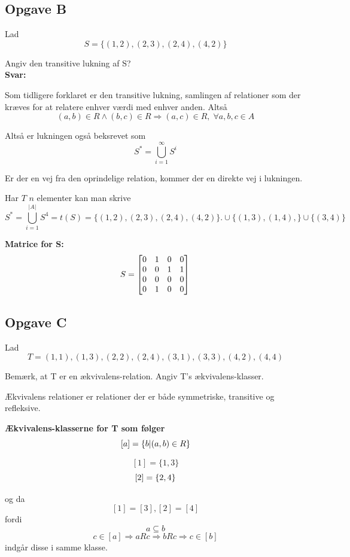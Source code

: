 \documentclass{article}
\begin{document}
\subsection{Opgave B}
Lad \[S = \{(1, 2),(2, 3),(2, 4),(4, 2)\}\]


Angiv den transitive lukning af S?
\\\textbf{Svar:}


Som tidligere forklaret er den transitive lukning, samlingen af relationer som der kræves for at relatere enhver værdi med enhver anden. Altså \[(a,b)\in R \wedge (b,c)\in R \Rightarrow (a,c)\in R, \;  \forall a,b,c \in A\]

Altså er lukningen også beksrevet som \[S^*=\bigcup_{i=1}^{\infty} S^i\]

Er der en vej fra den oprindelige relation, kommer der en direkte vej i lukningen.

Har $T$ $n$ elementer kan man skrive \[S^*=\bigcup_{i=1}^{|A|} S^4 = t(S)= \{(1, 2),(2, 3),(2, 4),(4, 2)\}. \cup \{(1,3), (1,4),\} \cup \{(3,4)\}\]



\textbf{Matrice for S:}\\

\[S=\begin{bmatrix}
0 & 1 & 0 & 0\\
0 & 0 & 1 & 1\\
0 & 0 & 0 & 0\\
0 & 1 & 0 & 0
\end{bmatrix}\\\]



\subsection{Opgave C}

Lad \[T = {(1, 1),(1, 3),(2, 2),(2, 4),(3, 1),(3, 3),(4, 2),(4, 4)}\]

Bemærk, at T er en ækvivalens-relation.
Angiv T's ækvivalens-klasser.

Ækvivalens relationer er relationer der er både symmetriske, transitive og refleksive. 

\textbf{Ækvivalens-klasserne for T som følger \[[a] = \{b \vert (a,b) \in R\}\\\]}



\[[1]=\{1,3\}\]
\[[2]=\{2,4\}\\\]

og da \[[1]=[3], [2]=[4]\] fordi \[a\subseteq b\] \[c \in [a] \Rightarrow aRc \Rightarrow bRc \Rightarrow c\in [b]\]
indgår disse i samme klasse.\\
\end{document}
